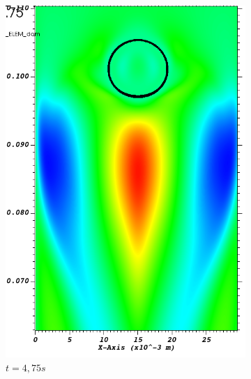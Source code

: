 \begin{figure}[H]
	\centering
	\begin{subfigure}[ht!]{0.23\textwidth}
		\centering
		\includegraphics[width=1\textwidth]{fig_plateau_vitesse/visit0009.png}
		\caption{$t=4,75s$}
		\label{fig:three sin x}
	\end{subfigure} 
	\begin{subfigure}[ht!]{0.23\textwidth}
		\centering

\end{subfigure}
\end{figure}
